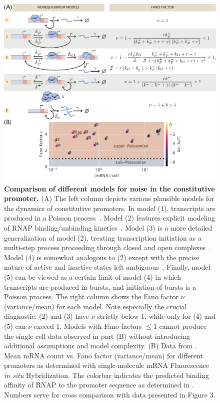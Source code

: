 \begin{figure}%
\centering
\includegraphics[width=\textwidth]{../../figures/main/fig02.pdf}
\caption{\textbf{Comparison of different models for noise in the constitutive promoter.}
(A) The left column depicts various plausible models for the dynamics of
constitutive promoters. In model (1), transcripts are produced in a Poisson
process~\cite{Sanchez2013, Jones2014}. Model (2) features explicit modeling of
RNAP binding/unbinding kinetics~\cite{Phillips2015a}. Model (3) is a more
detailed generalization of model (2), treating transcription initiation as a
multi-step process proceeding through closed and open
complexes~\cite{Mitarai2015}. Model (4) is somewhat analogous to (2) except with
the precise nature of active and inactive states left
ambiguous~\cite{Peccoud1995, Shahrezaei2008, Razo-Mejia2020}. Finally, model (5)
can be viewed as a certain limit of model (4) in which transcripts are produced
in bursts, and initiation of bursts is a Poisson process. 
The right column shows the Fano factor $\nu$ (variance/mean) for each model.
Note especially the crucial diagnostic: (2) and (3) have $\nu$ strictly below 1,
while only for (4) and (5) can $\nu$ exceed 1. Models with Fano factors $\le 1$
cannot produce the single-cell data observed in part (B) without introducing
additional assumptions and model complexity. (B) Data from \cite{Jones2014}.
Mean mRNA count vs. Fano factor (variance/mean) for different promoters as
determined with single-molecule mRNA Fluorescence \textit{in situ}
Hybridization. The colorbar indicates the predicted binding affinity of RNAP to
the promoter sequence as determined in \cite{Brewster2012}. Numbers serve for
cross comparison with data presented in Figure 3.}
\label{fig2:constit_cartoons}
\end{figure}

